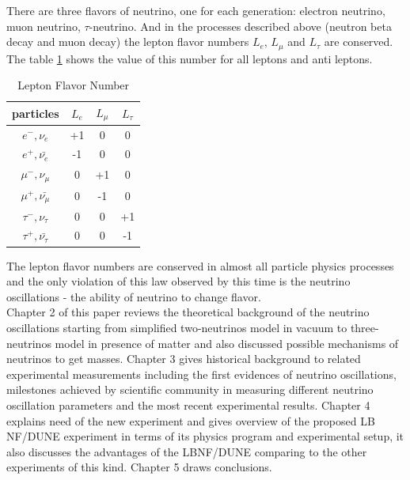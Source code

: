There are three flavors of neutrino, one for each generation: electron neutrino, muon neutrino, $\tau$-neutrino. And in the processes described above (neutron beta decay and muon decay) the lepton flavor numbers $L_e$, $L_{\mu}$ and $L_{\tau}$ are conserved. The table \ref{tab:LeptonFlavorNumber} shows the value of this number for all leptons and anti leptons. 

\begin{table}[h]
  \begin{center}
  \caption{ Lepton Flavor Number}
  \begin{tabular}{|c|c|c|c|}
     particles & $L_e$ & $L_{\mu}$ & $L_{\tau}$ \\ \hline
     $e^-,\nu_e$ &  +1  &  0  &  0  \\ \hline 
     $e^+, \bar{\nu_e}$ &  -1  &  0  &  0  \\ \hline 
     $\mu^-,\nu_{\mu}$ &  0  &  +1  &  0  \\ \hline 
     $\mu^+, \bar{\nu_{\mu}}$ &  0  &  -1  &  0  \\ \hline 
     $\tau^-,\nu_{\tau}$ &  0  &  0  &  +1  \\ \hline 
     $\tau^+, \bar{\nu_{\tau}}$ &  0  &  0  &  -1  \\ \hline 
  \end{tabular}
  \label{tab:LeptonFlavorNumber}
  \end{center}
\end{table}

The lepton flavor numbers are conserved in almost all particle physics processes and the only violation of this law observed by this time is the neutrino oscillations - the ability of neutrino to change flavor.\\ 
Chapter 2 of this paper reviews the theoretical background of the neutrino oscillations starting from simplified two-neutrinos model in vacuum to three-neutrinos model in presence of matter and also discussed possible mechanisms of neutrinos to get masses. Chapter 3 gives historical background to related experimental measurements including the first evidences of neutrino oscillations, milestones achieved by scientific community in measuring different neutrino oscillation parameters and the most recent experimental results. Chapter 4 explains need of the new experiment and gives overview of the proposed LB NF/DUNE experiment in terms of its physics program and experimental setup, it also discusses the advantages of the LBNF/DUNE comparing to the other experiments of this kind. Chapter 5 draws conclusions.  


